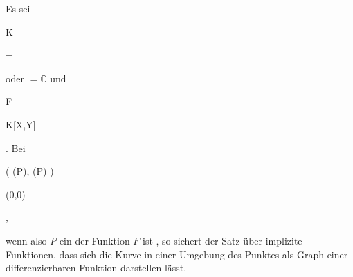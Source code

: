 {


Es sei


\mavergleichskette

{\vergleichskette

{ K
}

{ = }{ \R
}

{  }{
}

{    }{
}

{   }{
}

}
{}{}{}
oder $= {\mathbb C}$ und


\mavergleichskette

{\vergleichskette

{ F
}

{ \in }{ K[X,Y]
}

{  }{
}

{    }{
}

{   }{
}

}
{}{}{.}
Bei


\mavergleichskettedisp

{\vergleichskette

{ \left( (P), (P) \right)
}

{ \neq} { (0,0)
}

{ } {
}

{ } {
}

{ } {
}

}
{}{}{,}


wenn also $P$ ein
der Funktion $F$ ist
 {} {,}
so sichert der
Satz über implizite Funktionen,
dass sich die Kurve in einer
 {} {}
Umgebung des Punktes als Graph einer differenzierbaren Funktion darstellen lässt.


}
